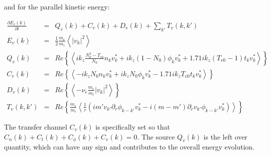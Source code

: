 \documentclass[12pt]{article}
\def\beqar{\begin{eqnarray}}
\def\eeqar{\end{eqnarray}}
\newcommand{\pdiff}[2]{\frac{\partial#1}{\partial#2}}
\newcommand{\pdr}{\partial_r}
\newcommand{\nue}{\nu_{e}}
\newcommand{\fmei}{\frac{m_e}{m_i}}
\begin{document}
and for the parallel kinetic energy:

\beqar
\label{Fourier_vpar_evolution}
\pdiff{E_v(k)}{t} & = & Q_v(k) + C_v(k) + D_v(k) + \sum_{k'} T_v(k,k') \\
E_v(k) & = & \frac{1}{2} \fmei \left< |v_k|^2 \right> \\
Q_v(k) & = & Re \left\{ \left<  i k_z \frac{N_0^2 - T_{e0}}{N_0} n_k v_k^* + i k_z (1 - N_0) \phi_k v_k^* + 1.71 i k_z (T_{e0} -1) t_k v_k^*   \right> \right\} \\
C_v(k) & = & Re \left\{ \left< - i k_z N_0 n_k v_k^* + i k_z N_0 \phi_k v_k^* - 1.71 i k_z T_{e0} t_k v_k^*  \right> \right\} \\
D_v(k) & = & Re \left\{ \left< - \nue \fmei |v_k|^2   \right> \right\} \\
T_v(k,k') & = & Re \left\{ \fmei \left< \frac{1}{r} \left( i m' v_{k'} \pdr \phi_{k-k'} v_k^*  - i (m - m') \pdr v_{k'} \phi_{k-k'} v_k^*        \right) \right> \right\}
\eeqar

The transfer channel $C_v(k)$ is specifically set so that $C_n(k) + C_t(k) + C_\phi(k) + C_v(k) = 0$. 
The source $Q_v(k)$ is the left over quantity, which can have any sign and contributes to the overall energy evolution.





%



%
%
\end{document}
